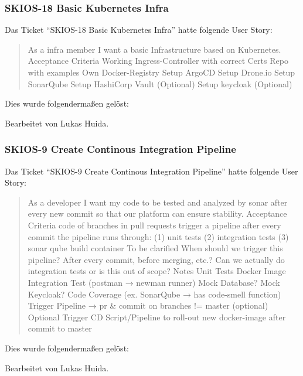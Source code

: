 \subsubsection{SKIOS-18 Basic Kubernetes Infra}
Das Ticket \enquote{SKIOS-18 Basic Kubernetes Infra} hatte folgende User Story:
\begin{quotation}
    As a infra member I want a basic Infrastructure based on Kubernetes.
    Acceptance Criteria
    Working Ingress-Controller with correct Certs
    Repo with examples
    Own Docker-Registry
    Setup ArgoCD
    Setup Drone.io
    Setup SonarQube
    Setup HashiCorp Vault (Optional)
    Setup keycloak (Optional)
\end{quotation}
Dies wurde folgendermaßen gelöst:
\begin{quotation}
    
\end{quotation}
Bearbeitet von Lukas Huida.

\subsubsection{SKIOS-9 Create Continous Integration Pipeline}
Das Ticket \enquote{SKIOS-9 Create Continous Integration Pipeline} hatte folgende User Story:
\begin{quotation}
    As a developer I want my code to be tested and analyzed by sonar after every new commit so that our platform can ensure stability.
    Acceptance Criteria
    code of branches in pull requests trigger a pipeline after every commit
    the pipeline runs through: (1) unit tests (2) integration tests (3) sonar qube
    build container
    To be clarified
    When should we trigger this pipeline? After every commit, before merging, etc.?
    Can we actually do integration tests or is this out of scope?
    Notes
    Unit Tests
    Docker Image
    Integration Test (postman → newman runner)
    Mock Database?
    Mock Keycloak?
    Code Coverage (ex. SonarQube → has code-smell function)
    Trigger Pipeline → pr & commit on branches != master (optional)
    Optional Trigger CD Script/Pipeline to roll-out new docker-image after commit to master
\end{quotation}
Dies wurde folgendermaßen gelöst:
\begin{quotation}
    
\end{quotation}
Bearbeitet von Lukas Huida.

